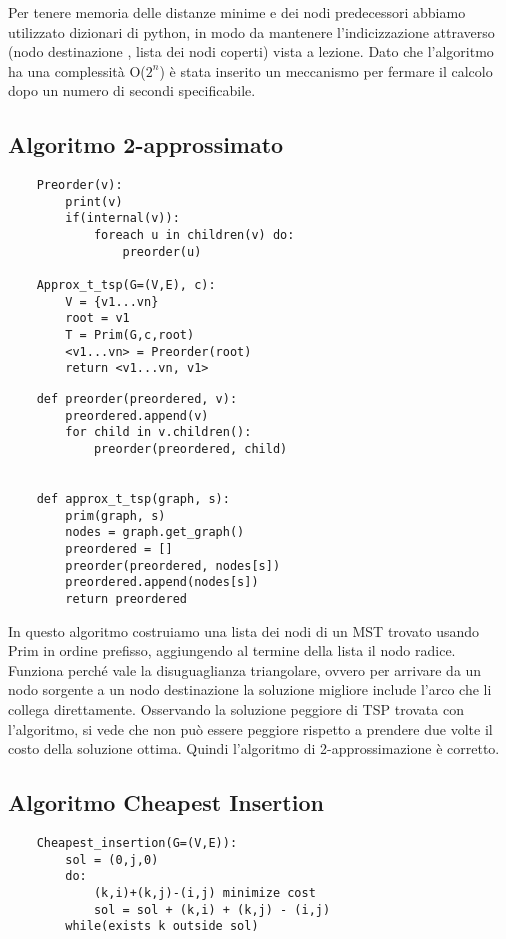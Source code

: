 Per tenere memoria delle distanze minime e dei nodi predecessori abbiamo utilizzato dizionari di python, in modo da mantenere l'indicizzazione attraverso (nodo destinazione , lista dei nodi coperti) vista a lezione.
Dato che l'algoritmo ha una complessità O(\(2^{n}\)) è stata inserito un meccanismo per fermare il calcolo dopo un numero di secondi specificabile.

\clearpage

\subsection{Algoritmo 2-approssimato\label{sec:a2a}}
\begin{verbatim}
    Preorder(v):
        print(v)
        if(internal(v)):
            foreach u in children(v) do:
                preorder(u)

    Approx_t_tsp(G=(V,E), c):
        V = {v1...vn}
        root = v1
        T = Prim(G,c,root)
        <v1...vn> = Preorder(root)
        return <v1...vn, v1>            
\end{verbatim}

\begin{verbatim}
    def preorder(preordered, v):
        preordered.append(v)
        for child in v.children():
            preorder(preordered, child)


    def approx_t_tsp(graph, s):
        prim(graph, s)
        nodes = graph.get_graph()
        preordered = []
        preorder(preordered, nodes[s])
        preordered.append(nodes[s])
        return preordered
\end{verbatim}

In questo algoritmo costruiamo una lista dei nodi di un MST trovato usando Prim in ordine prefisso, aggiungendo al termine della lista il nodo radice.
Funziona perché vale la disuguaglianza triangolare, ovvero per arrivare da un nodo sorgente a un nodo destinazione la soluzione migliore include l'arco che li collega direttamente.
Osservando la soluzione peggiore di TSP trovata con l'algoritmo, si vede che non può essere peggiore rispetto a prendere due volte il costo della soluzione ottima.
Quindi l'algoritmo di 2-approssimazione è corretto.

\clearpage

\subsection{Algoritmo Cheapest Insertion\label{sec:ci}}
\begin{verbatim}
    Cheapest_insertion(G=(V,E)):
        sol = (0,j,0)
        do:
            (k,i)+(k,j)-(i,j) minimize cost
            sol = sol + (k,i) + (k,j) - (i,j)
        while(exists k outside sol)    

\end{verbatim}

